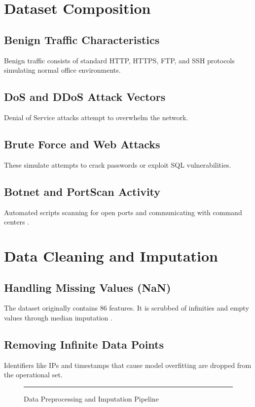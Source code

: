 \documentclass[12pt, a4paper]{report}
\begin{document}
\section{Dataset Composition}
\subsection{Benign Traffic Characteristics}
Benign traffic consists of standard HTTP, HTTPS, FTP, and SSH protocols simulating normal office environments.
\subsection{DoS and DDoS Attack Vectors}
Denial of Service attacks attempt to overwhelm the network.
\subsection{Brute Force and Web Attacks}
These simulate attempts to crack passwords or exploit SQL vulnerabilities.
\subsection{Botnet and PortScan Activity}
Automated scripts scanning for open ports and communicating with command centers \cite{ref5}.

\section{Data Cleaning and Imputation}
\subsection{Handling Missing Values (NaN)}
The dataset originally contains 86 features. It is scrubbed of infinities and empty values through median imputation \cite{ref6}.
\subsection{Removing Infinite Data Points}
Identifiers like IPs and timestamps that cause model overfitting are dropped from the operational set.

\begin{figure}[htbp]
    \centering
    \rule{\textwidth}{6cm} 
    \caption{Data Preprocessing and Imputation Pipeline}
    \label{fig:data_pipeline}
\end{figure}
\end{document}
